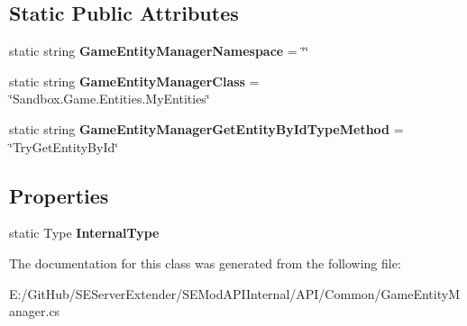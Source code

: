 \subsection*{Static Public Attributes}
\begin{DoxyCompactItemize}
\item 
\hypertarget{class_s_e_mod_a_p_i_internal_1_1_a_p_i_1_1_common_1_1_game_entity_manager_a6cbf80dcb3fbd0ca17ad678381a6c7b6}{}static string {\bfseries Game\+Entity\+Manager\+Namespace} = \char`\"{}\char`\"{}\label{class_s_e_mod_a_p_i_internal_1_1_a_p_i_1_1_common_1_1_game_entity_manager_a6cbf80dcb3fbd0ca17ad678381a6c7b6}

\item 
\hypertarget{class_s_e_mod_a_p_i_internal_1_1_a_p_i_1_1_common_1_1_game_entity_manager_a43d2a07fc5f914d272157f39a678a45d}{}static string {\bfseries Game\+Entity\+Manager\+Class} = \char`\"{}Sandbox.\+Game.\+Entities.\+My\+Entities\char`\"{}\label{class_s_e_mod_a_p_i_internal_1_1_a_p_i_1_1_common_1_1_game_entity_manager_a43d2a07fc5f914d272157f39a678a45d}

\item 
\hypertarget{class_s_e_mod_a_p_i_internal_1_1_a_p_i_1_1_common_1_1_game_entity_manager_a085511d649d8bb14b9b9cb23defdb6c6}{}static string {\bfseries Game\+Entity\+Manager\+Get\+Entity\+By\+Id\+Type\+Method} = \char`\"{}Try\+Get\+Entity\+By\+Id\char`\"{}\label{class_s_e_mod_a_p_i_internal_1_1_a_p_i_1_1_common_1_1_game_entity_manager_a085511d649d8bb14b9b9cb23defdb6c6}

\end{DoxyCompactItemize}
\subsection*{Properties}
\begin{DoxyCompactItemize}
\item 
\hypertarget{class_s_e_mod_a_p_i_internal_1_1_a_p_i_1_1_common_1_1_game_entity_manager_aa03dd53c99a621b590faca5c2854855b}{}static Type {\bfseries Internal\+Type}\label{class_s_e_mod_a_p_i_internal_1_1_a_p_i_1_1_common_1_1_game_entity_manager_aa03dd53c99a621b590faca5c2854855b}

\end{DoxyCompactItemize}


The documentation for this class was generated from the following file\+:\begin{DoxyCompactItemize}
\item 
E\+:/\+Git\+Hub/\+S\+E\+Server\+Extender/\+S\+E\+Mod\+A\+P\+I\+Internal/\+A\+P\+I/\+Common/Game\+Entity\+Manager.\+cs\end{DoxyCompactItemize}
